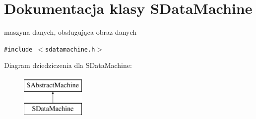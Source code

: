 \hypertarget{classSDataMachine}{
\section{Dokumentacja klasy SDataMachine}
\label{classSDataMachine}
}
maszyna danych, obsługująca obraz danych  


{\tt \#include $<$sdatamachine.h$>$}

Diagram dziedziczenia dla SDataMachine:\begin{figure}[H]
\begin{center}
\leavevmode
\includegraphics[height=2cm]{classSDataMachine}
\end{center}
\end{figure}
